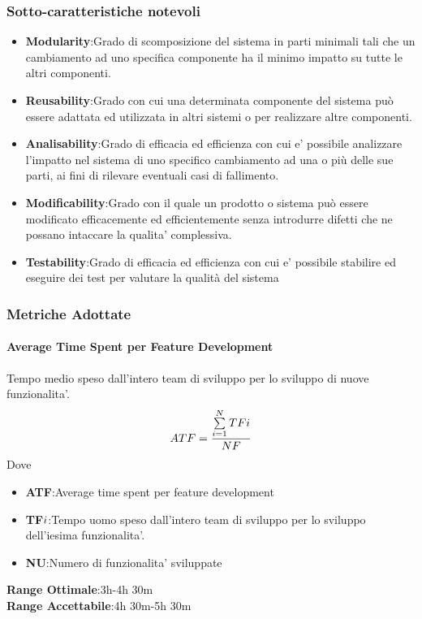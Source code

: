 \subsubsection{Sotto-caratteristiche notevoli}
\begin{itemize}
	\item{\textbf{Modularity}}:Grado di scomposizione del sistema in parti minimali tali che un cambiamento ad uno specifica componente ha il minimo impatto su tutte le altri componenti.
	\item{\textbf{Reusability}}:Grado con cui una determinata componente del sistema può essere adattata ed utilizzata in altri sistemi o per realizzare altre componenti.
	\item{\textbf{Analisability}}:Grado di efficacia ed efficienza con cui e' possibile analizzare l'impatto nel sistema di uno specifico cambiamento ad una o più delle sue parti, ai fini di rilevare eventuali casi di fallimento.
	\item{\textbf{Modificability}}:Grado con il quale un prodotto o sistema può essere modificato efficacemente ed efficientemente senza introdurre difetti che ne possano intaccare la qualita' complessiva.
	\item{\textbf{Testability}}:Grado di efficacia ed efficienza con cui e' possibile stabilire ed eseguire dei test per valutare la qualità del sistema
\end{itemize}
\subsubsection{Metriche Adottate}
\paragraph{Average Time Spent per Feature Development}
\begin{flushleft}
Tempo medio speso dall'intero team di sviluppo per lo sviluppo di nuove funzionalita'.
	$$ATF=\frac{\sum\limits_{i=1}^N TF{\small{i}}}{NF}$$
Dove
\begin{itemize}
	\item{\textbf{ATF}}:Average time spent per feature development
	\item{\textbf{TF${\small{i}}$}}:Tempo uomo speso dall'intero team di sviluppo per lo sviluppo dell'iesima funzionalita'.
	\item{\textbf{NU}}:Numero di funzionalita' sviluppate
\end{itemize}
\textbf{Range Ottimale}:3h-4h 30m \\
\textbf{Range Accettabile}:4h 30m-5h 30m
\end{flushleft}
